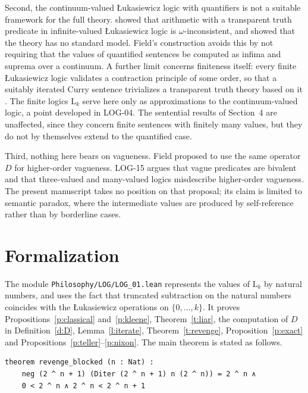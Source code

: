 \documentclass{situationist-preprint}
\begin{document}
Second, the continuum-valued Łukasiewicz logic with quantifiers is not a suitable framework for the full theory. \citet{Restall1992} showed that arithmetic with a transparent truth predicate in infinite-valued Łukasiewicz logic is $\omega$-inconsistent, and \citet{HajekEtAl2000} showed that the theory has no standard model. Field's construction avoids this by not requiring that the values of quantified sentences be computed as infima and suprema over a continuum. A further limit concerns finiteness itself: every finite Łukasiewicz logic validates a contraction principle of some order, so that a suitably iterated Curry sentence trivializes a transparent truth theory based on it \citep{Moh1954}. The finite logics $\mathrm{L}_k$ serve here only as approximations to the continuum-valued logic, a point developed in LOG-04. The sentential results of Section~4 are unaffected, since they concern finite sentences with finitely many values, but they do not by themselves extend to the quantified case.

Third, nothing here bears on vagueness. Field proposed to use the same operator $D$ for higher-order vagueness. LOG-15 argues that vague predicates are bivalent and that three-valued and many-valued logics misdescribe higher-order vagueness. The present manuscript takes no position on that proposal; its claim is limited to semantic paradox, where the intermediate values are produced by self-reference rather than by borderline cases.

\section{Formalization}

The module \nolinkurl{Philosophy/LOG/LOG_01.lean} represents the values of $\mathrm{L}_k$ by natural numbers, and uses the fact that truncated subtraction on the natural numbers coincides with the Łukasiewicz operations on $\{0, \ldots, k\}$. It proves Propositions~\ref{p:classical} and~\ref{p:kleene}, Theorem~\ref{t:liar}, the computation of $D$ in Definition~\ref{d:D}, Lemma~\ref{l:iterate}, Theorem~\ref{t:revenge}, Proposition~\ref{p:exact} and Propositions~\ref{p:teller}--\ref{p:nixon}. The main theorem is stated as follows.

\begin{lstlisting}
theorem revenge_blocked (n : Nat) :
    neg (2 ^ n + 1) (Diter (2 ^ n + 1) n (2 ^ n)) = 2 ^ n ∧
    0 < 2 ^ n ∧ 2 ^ n < 2 ^ n + 1
\end{lstlisting}
\end{document}
